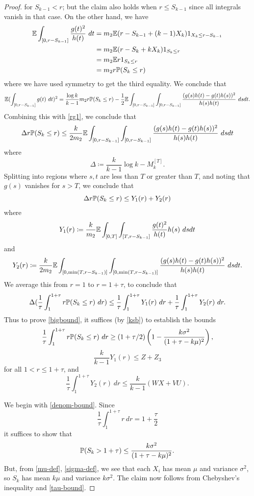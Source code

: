 \begin{proof}
for $S_{k-1} < r$; but the claim also holds when $r \leq S_{k-1}$ since all integrals vanish in that case.  On the other hand, we have
\begin{align*}
\E \int_{[0,r-S_{k-1}]} \frac{g(t)^2}{h(t)}\ dt &= m_2 \E (r - S_{k-1} + (k-1) X_k) 1_{X_k \leq r - S_{k-1} }\\
&= m_2 \E (r - S_k + k X_k) 1_{S_k \leq r} \\
&= m_2 \E r 1_{S_k \leq r} \\
&= m_2 r \P( S_k \leq r)
\end{align*}
where we have used symmetry to get the third equality.  We conclude that
$$ \E (\int_{[0,r-S_{k-1}]} g(t)\ dt)^2 = \frac{\log k}{k-1} m_2 r \P(S_k \leq r) - \frac{1}{2} \E \int_{[0,r-S_{k-1}]} \int_{[0,r-S_{k-1}]} \frac{(g(s)h(t)-g(t)h(s))^2}{h(s)h(t)}\ ds dt.$$
Combining this with \eqref{rg1}, we conclude that
$$
\Delta r \P( S_k \leq r) \leq \frac{k}{2m_2}
\E \int_{[0,r-S_{k-1}]} \int_{[0,r-S_{k-1}]} \frac{(g(s)h(t)-g(t)h(s))^2}{h(s)h(t)}\ ds dt
$$
where
$$ \Delta \coloneqq \frac{k}{k-1} \log k - M_k^{[T]}.$$
Splitting into regions where $s,t$ are less than $T$ or greater than $T$, and noting that $g(s)$ vanishes for $s > T$, we conclude that
$$
\Delta r \P( S_k \leq r) \leq Y_1(r) + Y_2(r)$$
where 
$$ Y_1(r) \coloneqq \frac{k}{m_2} \E \int_{[0,T]} \int_{[T,r-S_{k-1}]} \frac{g(t)^2}{h(t)} h(s)\ ds dt $$
and
$$ Y_2(r) \coloneqq \frac{k}{2m_2} \E \int_{[0,\min(T,r-S_{k-1})]} \int_{[0,\min(T,r-S_{k-1})]} \frac{(g(s)h(t)-g(t)h(s))^2}{h(s)h(t)}\ ds dt.$$
We average this from $r=1$ to $r=1+\tau$, to conclude that
$$
\Delta (\frac{1}{\tau} \int_1^{1+\tau} r \P( S_k \leq r)\ dr) \leq \frac{1}{\tau} \int_1^{1+\tau} Y_1(r)\ dr + 
\frac{1}{\tau} \int_1^{1+\tau} Y_2(r)\ dr.$$
Thus to prove \eqref{bigbound}, it suffices (by \eqref{ksb}) to establish the bounds
\begin{equation}\label{denom-bound}
\frac{1}{\tau} \int_1^{1+\tau} r \P( S_k \leq r)\ dr \geq 
(1+\tau/2) \left(1 - \frac{k\sigma^2}{(1+\tau-k\mu)^2}\right),
\end{equation}
\begin{equation}\label{y1-bound}
\frac{k}{k-1} Y_1(r) \leq Z + Z_3
\end{equation}
for all $1 < r \leq 1+\tau$, and
\begin{equation}\label{y2-bound}
\frac{1}{\tau} \int_1^{1+\tau} Y_2(r)\ dr \leq \frac{k}{k-1}( WX+VU ).
\end{equation}

We begin with \eqref{denom-bound}.  Since
$$ \frac{1}{\tau} \int_1^{1+\tau} r\ dr = 1+\frac{\tau}{2}$$
it suffices to show that
$$
\P( S_k > 1+\tau) \leq \frac{k\sigma^2}{(1+\tau-k\mu)^2}.
$$
But, from \eqref{mu-def}, \eqref{sigma-def}, we see that each $X_i$ has mean $\mu$ and variance $\sigma^2$, so $S_k$ has mean $k\mu$ and variance $k\sigma^2$.  The claim now follows from Chebyshev's inequality and \eqref{tau-bound}.


\end{proof}
